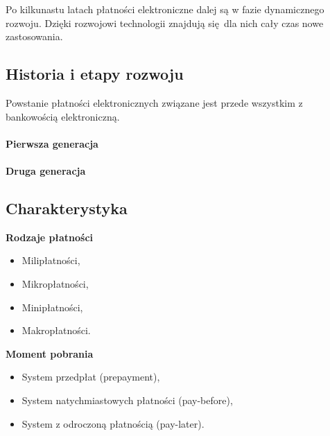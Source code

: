 Po kilkunastu latach płatności elektroniczne dalej są w fazie dynamicznego rozwoju. Dzięki rozwojowi technologii znajdują się dla nich cały czas nowe zastosowania. 

\subsection{Historia i etapy rozwoju}


Powstanie płatności elektronicznych związane jest przede wszystkim z bankowością elektroniczną.


\paragraph{Pierwsza generacja}

\paragraph{Druga generacja}

\subsection{Charakterystyka}


\noindent
\textbf{Rodzaje płatności}
\begin{itemize}
	\item Milipłatności,
	\item Mikropłatności,
	\item Minipłatności,
	\item Makropłatności. 
\end{itemize}

\noindent
\textbf{Moment pobrania}
\begin{itemize}
	\item System przedpłat (prepayment),
	\item System natychmiastowych płatności (pay-before),
	\item System z odroczoną płatnością (pay-later).
\end{itemize}

